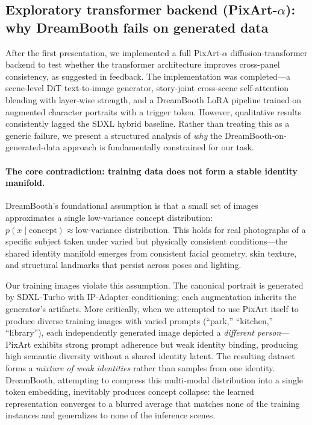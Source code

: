 \subsection{Exploratory transformer backend (PixArt-$\alpha$): why DreamBooth fails on generated data}
\label{sec:dit_discussion}

After the first presentation, we implemented a full PixArt-$\alpha$ diffusion-transformer backend to test whether the transformer architecture improves cross-panel consistency, as suggested in feedback. The implementation was completed---a scene-level DiT text-to-image generator, story-joint cross-scene self-attention blending with layer-wise strength, and a DreamBooth LoRA pipeline trained on augmented character portraits with a trigger token. However, qualitative results consistently lagged the SDXL hybrid baseline. Rather than treating this as a generic failure, we present a structured analysis of \emph{why} the DreamBooth-on-generated-data approach is fundamentally constrained for our task.

\paragraph{The core contradiction: training data does not form a stable identity manifold.}

DreamBooth's foundational assumption is that a small set of images approximates a single low-variance concept distribution: $p(x \mid \text{concept}) \approx \text{low-variance distribution}$. This holds for real photographs of a specific subject taken under varied but physically consistent conditions---the shared identity manifold emerges from consistent facial geometry, skin texture, and structural landmarks that persist across poses and lighting.

Our training images violate this assumption. The canonical portrait is generated by SDXL-Turbo with IP-Adapter conditioning; each augmentation inherits the generator's artifacts. More critically, when we attempted to use PixArt itself to produce diverse training images with varied prompts (``park,'' ``kitchen,'' ``library''), each independently generated image depicted a \emph{different person}---PixArt exhibits strong prompt adherence but weak identity binding, producing high semantic diversity without a shared identity latent. The resulting dataset forms a \emph{mixture of weak identities} rather than samples from one identity. DreamBooth, attempting to compress this multi-modal distribution into a single token embedding, inevitably produces concept collapse: the learned representation converges to a blurred average that matches none of the training instances and generalizes to none of the inference scenes.

